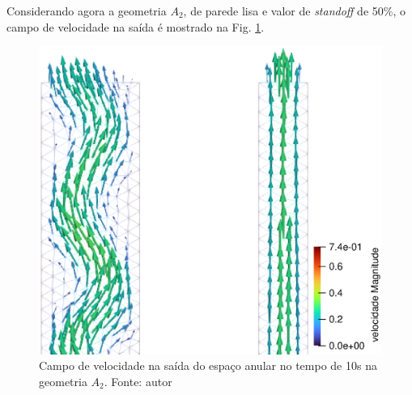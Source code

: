     
Considerando agora a geometria $A_2$, de parede lisa e valor de \textit{standoff} de 50\%, o campo de velocidade na saída é mostrado na Fig. \ref{fig:perfil_velocidade_liso_saida_standoff_paraview}.
\begin{figure}[H]
        \centering
    	\includegraphics[scale=0.5]{img/perfil_vel/liso/perfil_de_vel_saida_standoff_paraview.eps}
    	\caption{Campo de velocidade na saída do espaço anular no tempo de 10s na geometria $A_2$. Fonte: autor}
    	\label{fig:perfil_velocidade_liso_saida_standoff_paraview}
\end{figure}
    
